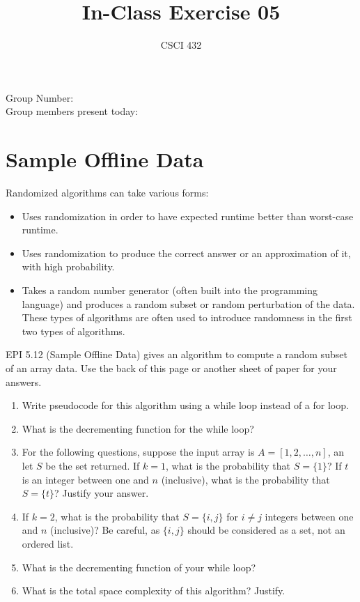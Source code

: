 \documentclass{article}
\title{In-Class Exercise 05}
\author{CSCI 432}
\begin{document}
\maketitle

\noindent
Group Number:\\
Group members present today:

\section*{Sample Offline Data}
Randomized algorithms can take various forms:
\begin{itemize}
    \item Uses randomization in order to have expected runtime better than
        worst-case runtime.
    \item Uses randomization to produce the correct answer or an approximation
        of it, with high
        probability.
    \item Takes a random number generator (often built into the programming
        language) and produces a random subset or random
        perturbation of the data.  These types of algorithms are often used to
        introduce randomness in the first two types of algorithms.
\end{itemize}
EPI 5.12 (Sample Offline Data) gives an algorithm to compute a random
subset of an array data.  Use the back of this page or another sheet of paper
for your answers.

\begin{enumerate}
    \item Write pseudocode for this algorithm using a while loop instead of a
        for loop.
    \item What is the decrementing function for the while loop?
    \item For the following questions, suppose the input array is
        $A=[1,2,\ldots,n]$, an let $S$ be the set
        returned. If $k=1$, what is the probability that $S=\{1\}$?  If $t$ is
        an integer between one and $n$ (inclusive), what is the
        probability that $S=\{t\}$?  Justify your answer.
    \item If $k=2$, what is the probability that $S=\{i,j\}$ for $i \neq j$
        integers between one and $n$ (inclusive)? Be careful, as
        $\{i,j\}$ should be considered as a set, not an ordered list.
    \item What is the decrementing function of your while loop?
    \item What is the total space complexity of this algorithm? Justify.
\end{enumerate}
\end{document}
